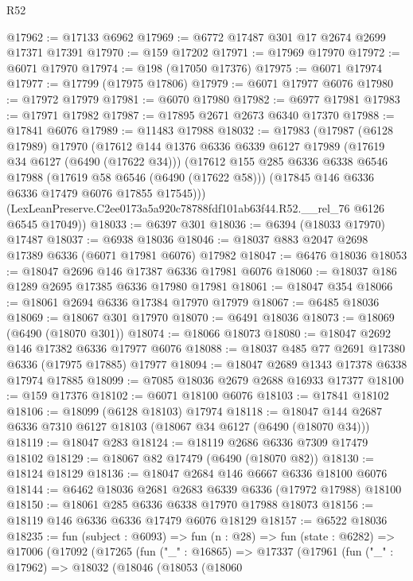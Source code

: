 \begin{lexlean}{R52}
\begin{coremodule}
@17962 := @17133 @6962
@17969 := @6772 @17487 @301 @17 @2674 @2699 @17371 @17391
@17970 := @159 @17202
@17971 := @17969 @17970
@17972 := @6071 @17970
@17974 := @198 (@17050 @17376)
@17975 := @6071 @17974
@17977 := @17799 (@17975 @17806)
@17979 := @6071 @17977 @6076
@17980 := @17972 @17979
@17981 := @6070 @17980
@17982 := @6977 @17981
@17983 := @17971 @17982
@17987 := @17895 @2671 @2673 @6340 @17370
@17988 := @17841 @6076
@17989 := @11483 @17988
@18032 := @17983
    (@17987
      (@6128 @17989)
      @17970
      (@17612
        @144
        @1376
        @6336
        @6339
        @6127
        @17989
        (@17619 @34 @6127 (@6490 (@17622 @34)))
        (@17612
          @155
          @285
          @6336
          @6338
          @6546
          @17988
          (@17619 @58 @6546 (@6490 (@17622 @58)))
          (@17845 @146 @6336 @6336 @17479 @6076 @17855 @17545)))
      (LexLeanPreserve.C2ee0173a5a920c78788fdf101ab63f44.R52.__rel_76 @6126 @6545 @17049))
@18033 := @6397 @301
@18036 := @6394 (@18033 @17970) @17487
@18037 := @6938 @18036
@18046 := @18037 @883 @2047 @2698 @17389 @6336 (@6071 @17981 @6076) @17982
@18047 := @6476 @18036
@18053 := @18047 @2696 @146 @17387 @6336 @17981 @6076
@18060 := @18037 @186 @1289 @2695 @17385 @6336 @17980 @17981
@18061 := @18047 @354
@18066 := @18061 @2694 @6336 @17384 @17970 @17979
@18067 := @6485 @18036
@18069 := @18067 @301 @17970
@18070 := @6491 @18036
@18073 := @18069 (@6490 (@18070 @301))
@18074 := @18066 @18073
@18080 := @18047 @2692 @146 @17382 @6336 @17977 @6076
@18088 := @18037 @485 @77 @2691 @17380 @6336 (@17975 @17885) @17977
@18094 := @18047 @2689 @1343 @17378 @6338 @17974 @17885
@18099 := @7085 @18036 @2679 @2688 @16933 @17377
@18100 := @159 @17376
@18102 := @6071 @18100 @6076
@18103 := @17841 @18102
@18106 := @18099 (@6128 @18103) @17974
@18118 := @18047 @144 @2687 @6336 @7310 @6127 @18103 (@18067 @34 @6127 (@6490 (@18070 @34)))
@18119 := @18047 @283
@18124 := @18119 @2686 @6336 @7309 @17479 @18102
@18129 := @18067 @82 @17479 (@6490 (@18070 @82))
@18130 := @18124 @18129
@18136 := @18047 @2684 @146 @6667 @6336 @18100 @6076
@18144 := @6462 @18036 @2681 @2683 @6339 @6336 (@17972 @17988) @18100
@18150 := @18061 @285 @6336 @6338 @17970 @17988 @18073
@18156 := @18119 @146 @6336 @6336 @17479 @6076 @18129
@18157 := @6522 @18036
@18235 := fun (subject : @6093) =>
  fun (n : @28) =>
  fun (state : @6282) =>
  @17006
    (@17092
      (@17265
        (fun ("_" : @16865) =>
        @17337
          (@17961
            (fun ("_" : @17962) =>
            @18032
              (@18046
                (@18053
                  (@18060

\end{coremodule}
\end{lexlean}
